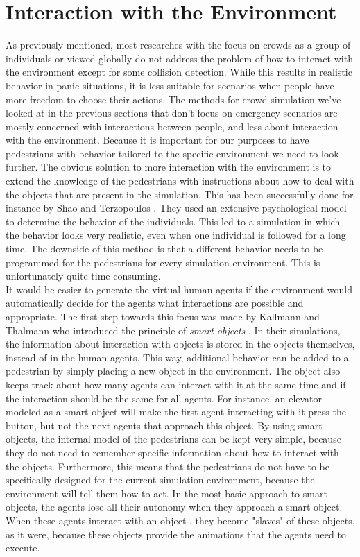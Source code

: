 \documentclass[11pt, a4paper]{book}
\begin{document}
\section{Interaction with the Environment}
As previously mentioned, most researches with the focus on crowds as a group of individuals or viewed globally do not address the problem of how to interact with the environment except for some collision detection. While this results in realistic behavior in panic situations, it is less suitable for scenarios when people have more freedom to choose their actions. The methods for crowd simulation we've looked at in the previous sections that don't focus on emergency scenarios are mostly concerned with interactions between people, and less about interaction with the environment. Because it is important for our purposes to have pedestrians with behavior tailored to the specific environment we need to look further. The obvious solution to more interaction with the environment is to extend the knowledge of the pedestrians with instructions about how to deal with the objects that are present in the simulation. This has been successfully done for instance by Shao and Terzopoulos \cite{A_autonomouspedestrians}. They used an extensive psychological model to determine the behavior of the individuals. This led to a simulation in which the behavior looks very realistic, even when one individual is followed for a long time. The downside of this method is that a different behavior needs to be programmed for the pedestrians for every simulation environment. This is unfortunately quite time-consuming. \\
It would be easier to generate the virtual human agents if the environment would automatically decide for the agents what interactions are possible and appropriate. The first step towards this focus was made by Kallmann and Thalmann who introduced the principle of \textit{smart objects} \cite{Kallmann98modelingobjects}. In their simulations, the information about interaction with objects is stored in the objects themselves, instead of in the human agents. This way, additional behavior can be added to a pedestrian by simply placing a new object in the environment. The object also keeps track about how many agents can interact with it at the same time and if the interaction should be the same for all agents. For instance, an elevator modeled as a smart object will make the first agent interacting with it press the button, but not the next agents that approach this object. By using smart objects, the internal model of the pedestrians can be kept very simple, because they do not need to remember specific information about how to interact with the objects. Furthermore, this means that the pedestrians do not have to be specifically designed for the current simulation environment, because the environment will tell them how to act. In the most basic approach to smart objects, the agents lose all their autonomy when they approach a smart object. When these agents interact with an object , they become "slaves" of these objects, as it were, because these objects provide the animations that the agents need to execute. 
\end{document}
